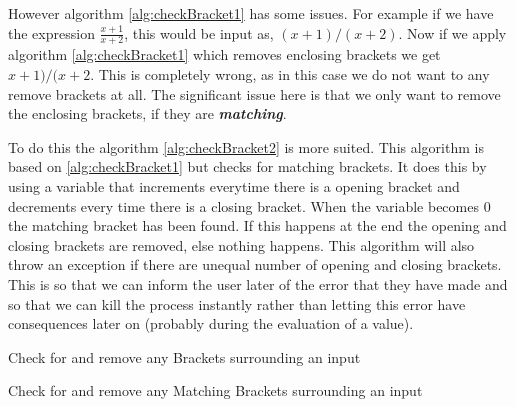 \documentclass[../../../../../main.tex]{subfiles}
\begin{document}
However algorithm \ref{alg:checkBracket1} has some issues. For example if we have the expression $\frac{x+1}{x+2}$, this would be input as, $(x+1)/(x+2)$. Now if we apply algorithm \ref{alg:checkBracket1} which removes enclosing brackets we get $x+1)/(x+2$. This is completely wrong, as in this case we do not want to any remove brackets at all. The significant issue here is that we only want to remove the enclosing brackets, if they are \textit{\textbf{matching}}.

To do this the algorithm \ref{alg:checkBracket2} is more suited. This algorithm is based on \ref{alg:checkBracket1} but checks for matching brackets. It does this by using a variable that increments everytime there is a opening bracket and decrements every time there is a closing bracket. When the variable becomes 0 the matching bracket has been found. If this happens at the end the opening and closing brackets are removed, else nothing happens. 
This algorithm will also throw an exception if there are unequal number of opening and closing brackets. This is so that we can inform the user later of the error that they have made and so that we can kill the process instantly rather than letting this error have consequences later on (probably during the evaluation of a value).
\begin{algorithm}
\DontPrintSemicolon
\caption{Check for and remove any Brackets surrounding an input}
\label{alg:checkBracket1}
\end{algorithm}

\begin{algorithm}[H]
\DontPrintSemicolon
\caption{Check for and remove any Matching Brackets surrounding an input}
\label{alg:checkBracket2}
\end{algorithm}
\newpage
\end{document}

